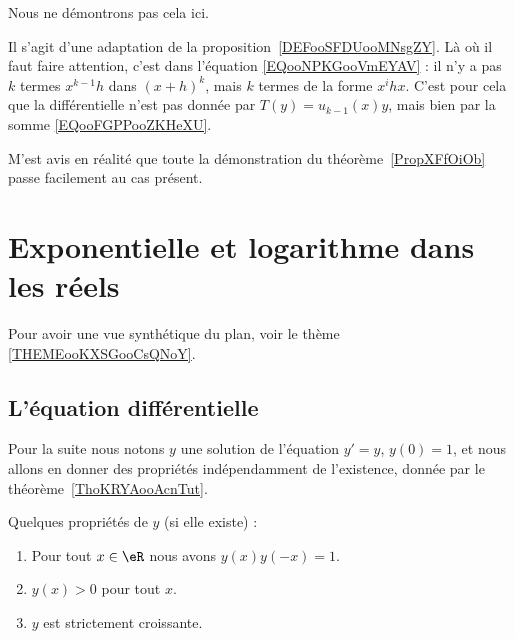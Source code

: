 \begin{normaltext}
    Nous ne démontrons pas cela ici.

    Il s'agit d'une adaptation de la proposition~\ref{DEFooSFDUooMNsgZY}. Là où il faut faire attention, c'est dans l'équation \eqref{EQooNPKGooVmEYAV} : il n'y a pas \( k\) termes \( x^{k-1}h\) dans \( (x+h)^k\), mais \( k\) termes de la forme \( x^ihx\). C'est pour cela que la différentielle n'est pas donnée par \( T(y)=u_{k-1}(x)y\), mais bien par la somme \eqref{EQooFGPPooZKHeXU}.

    M'est avis en réalité que toute la démonstration du théorème~\ref{PropXFfOiOb} passe facilement au cas présent.
\end{normaltext}

\section{Exponentielle et logarithme dans les réels}

Pour avoir une vue synthétique du plan, voir le thème \ref{THEMEooKXSGooCsQNoY}.

\subsection{L'équation différentielle}

Pour la suite nous notons \( y\) une solution de l'équation \( y'=y\), \( y(0)=1\), et nous allons en donner des propriétés indépendamment de l'existence, donnée par le théorème~\ref{ThoKRYAooAcnTut}.

\begin{proposition} \label{PropTLECooEiLbPP}
    Quelques propriétés de \( y\) (si elle existe) :
    \begin{enumerate}
        \item
            Pour tout \( x\in \eR\) nous avons \( y(x)y(-x)=1\).
        \item
            \( y(x)>0\) pour tout \( x\).
        \item
            \( y\) est strictement croissante.
    \end{enumerate}
\end{proposition}

